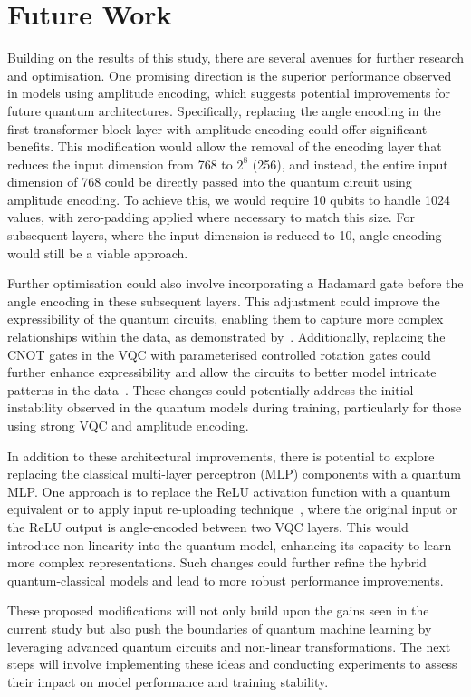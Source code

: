 \section{Future Work}
\label{sec:future_work}
Building on the results of this study, there are several avenues for
further research and optimisation. One promising direction is the
superior performance observed in models using amplitude encoding,
which suggests potential improvements for future quantum
architectures. Specifically, replacing the angle encoding in the
first transformer block layer with amplitude encoding could offer
significant benefits. This modification would allow the removal of
the encoding layer that reduces the input dimension from 768 to
\(2^8\) (256), and instead, the entire input dimension of 768 could
be directly passed into the quantum circuit using amplitude encoding.
To achieve this, we would require 10 qubits to handle 1024 values,
with zero-padding applied where necessary to match this size. For
subsequent layers, where the input dimension is reduced to 10, angle
encoding would still be a viable approach.

Further optimisation could also involve incorporating a Hadamard gate
before the angle encoding in these subsequent layers. This adjustment
could improve the expressibility of the quantum circuits, enabling
them to capture more complex relationships within the data, as
demonstrated by~\citet{Sim_2019}. Additionally, replacing the CNOT
gates in the VQC with parameterised controlled rotation gates could
further enhance expressibility and allow the circuits to better model
intricate patterns in the data~\cite{chu2022qmlp}. These changes
could potentially address the initial instability observed in the
quantum models during training, particularly for those using strong
VQC and amplitude encoding.

In addition to these architectural improvements, there is potential
to explore replacing the classical multi-layer perceptron (MLP)
components with a quantum MLP. One approach is to replace the ReLU
activation function with a quantum equivalent or to apply input
re-uploading technique~\cite{chu2022qmlp}, where the original input
or the ReLU output
is angle-encoded between two VQC layers. This would introduce
non-linearity into the quantum model, enhancing its capacity to learn
more complex representations. Such changes could further refine the
hybrid quantum-classical models and lead to more robust performance
improvements.

These proposed modifications will not only build upon the gains seen
in the current study but also push the boundaries of quantum machine
learning by leveraging advanced quantum circuits and non-linear
transformations. The next steps will involve implementing these ideas
and conducting experiments to assess their impact on model
performance and training stability.
